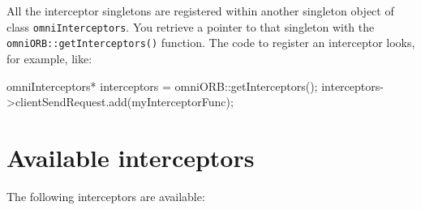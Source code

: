 \documentclass[11pt,twoside,a4paper]{book}
\newcommand{\code}[1]{\texttt{#1}}
\newcommand{\op}[1]{\texttt{#1()}}
\newcommand{\dsc}{\discretionary{}{}{}}
\begin{document}
All the interceptor singletons are registered within another singleton
object of class \code{omniInterceptors}. You retrieve a pointer to
that singleton with the \op{omniORB::\dsc{}getInterceptors} function.
The code to register an interceptor looks, for example, like:

\begin{cxxlisting}
omniInterceptors* interceptors = omniORB::getInterceptors();
interceptors->clientSendRequest.add(myInterceptorFunc);
\end{cxxlisting}


\section{Available interceptors}

The following interceptors are available:
\end{document}
